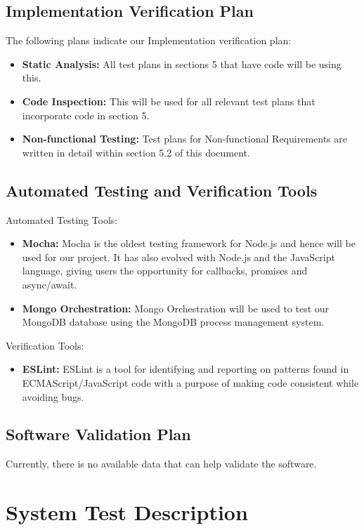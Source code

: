 \documentclass[12pt, titlepage]{article}
\begin{document}
\subsection{Implementation Verification Plan}
The following plans indicate our Implementation verification plan:
\begin{itemize}
    \item \textbf{Static Analysis:} All test plans in sections 5 that have code will be using this.
    \item \textbf{Code Inspection:} This will be used for all relevant test plans that incorporate code in section 5.
    \item \textbf{Non-functional Testing:} Test plans for Non-functional Requirements are written in detail within section 5.2 of this document.
\end{itemize}

\subsection{Automated Testing and Verification Tools}
Automated Testing Tools:
\begin{itemize}
    \item \textbf{Mocha:} Mocha is the oldest testing framework for Node.js and hence will be used for our project. It has also evolved with Node.js and the JavaScript language, giving users the opportunity for callbacks, promises and async/await. 
    \item \textbf{Mongo Orchestration:} Mongo Orchestration will be used to test our MongoDB database using the MongoDB process management system.
\end{itemize}
Verification Tools:
\begin{itemize}
    \item \textbf{ESLint:} ESLint is a tool for identifying and reporting on patterns found in ECMAScript/JavaScript code with a purpose of making code consistent while avoiding bugs.
\end{itemize}

\subsection{Software Validation Plan}

Currently, there is no available data that can help validate the software.




\section{System Test Description}
	
\end{document}
